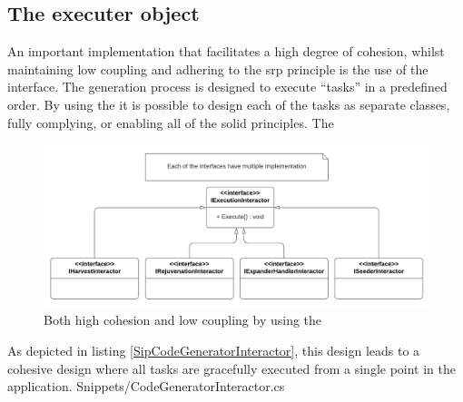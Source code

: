\subsection{The executer object} \label{subsec:IExecutionInteractorObject}

An important implementation that facilitates a high degree of cohesion, whilst maintaining
low coupling and adhering to the \gls{srp} principle is the use of the
 interface. The generation process is designed to
execute \enquote{tasks} in a predefined order. By using the
 it is possible to design each of the tasks as
separate classes, fully complying, or enabling all of the \gls{solid} principles. The 

\begin{figure}[H]
    \centering
    \includegraphics[width=1\textwidth]{Figures/class_diagram_iexecutioninteractor.pdf}
    \caption[Plugin Archticture]{Both high cohesion and low coupling by using the }
    \label{fig:iexecutioninteractor}
  \end{figure}


As depicted in listing \ref{SipCodeGeneratorInteractor}, this design leads to a cohesive
design where all tasks are gracefully executed from a single point in the application.
 {Snippets/CodeGeneratorInteractor.cs}